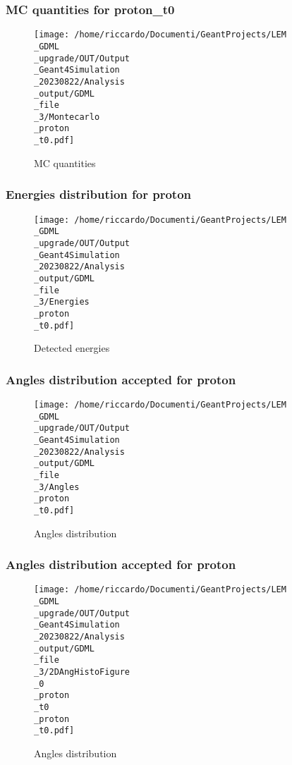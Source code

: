 \documentclass[8pt]{beamer}
\begin{document}
            \begin{frame}
                \frametitle{MC quantities for proton\_t0}
            
        \begin{figure}[h]
            \centering
            \texttt{[image: /home/riccardo/Documenti/GeantProjects/LEM\\\_GDML\\\_upgrade/OUT/Output\\\_Geant4Simulation\\\_20230822/Analysis\\\_output/GDML\\\_file\\\_3/Montecarlo\\\_proton\\\_t0.pdf]}
            \caption{MC quantities}
        \end{figure}
        
            \end{frame}
            
            \begin{frame}
                \frametitle{Energies distribution for proton}
            
        \begin{figure}[h]
            \centering
            \texttt{[image: /home/riccardo/Documenti/GeantProjects/LEM\\\_GDML\\\_upgrade/OUT/Output\\\_Geant4Simulation\\\_20230822/Analysis\\\_output/GDML\\\_file\\\_3/Energies\\\_proton\\\_t0.pdf]}
            \caption{Detected energies}
        \end{figure}
        
            \end{frame}
            
            \begin{frame}
                \frametitle{Angles distribution accepted for proton}
            
        \begin{figure}[h]
            \centering
            \texttt{[image: /home/riccardo/Documenti/GeantProjects/LEM\\\_GDML\\\_upgrade/OUT/Output\\\_Geant4Simulation\\\_20230822/Analysis\\\_output/GDML\\\_file\\\_3/Angles\\\_proton\\\_t0.pdf]}
            \caption{Angles distribution}
        \end{figure}
        
            \end{frame}
            
            \begin{frame}
                \frametitle{Angles distribution accepted for proton}
            
        \begin{figure}[h]
            \centering
            \texttt{[image: /home/riccardo/Documenti/GeantProjects/LEM\\\_GDML\\\_upgrade/OUT/Output\\\_Geant4Simulation\\\_20230822/Analysis\\\_output/GDML\\\_file\\\_3/2DAngHistoFigure\\\_0\\\_proton\\\_t0\\\_proton\\\_t0.pdf]}
            \caption{Angles distribution}
        \end{figure}
        
            \end{frame}
            
\end{document}
